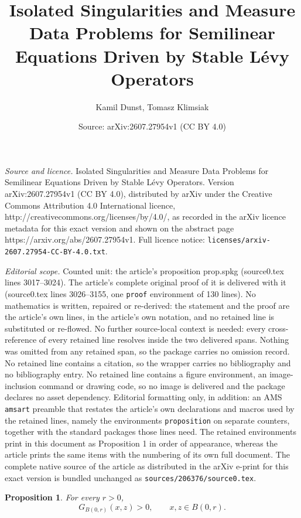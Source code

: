 \documentclass[10pt,a4paper]{amsart}
\title{Isolated Singularities and Measure Data Problems for Semilinear Equations Driven by Stable L\'evy Operators}
\author{Kamil Dunst, Tomasz Klimsiak}
\date{Source: arXiv:2607.27954v1 (CC BY 4.0)}
\newtheorem{proposition}{Proposition}
\begin{document}
\maketitle

\noindent\emph{Source and licence.} Isolated Singularities and Measure Data Problems for Semilinear Equations Driven by Stable L\'evy Operators. Version arXiv:2607.27954v1 (CC BY 4.0), distributed by arXiv under the Creative Commons Attribution 4.0 International licence, http://creativecommons.org/licenses/by/4.0/, as recorded in the arXiv licence metadata for this exact version and shown on the abstract page https://arxiv.org/abs/2607.27954v1. Full licence notice: \texttt{licenses/arxiv-2607.27954-CC-BY-4.0.txt}.\par\smallskip

\noindent\textit{Editorial scope.} Counted unit: the article's proposition prop.spkg (source0.tex lines 3017--3024). The article's complete original proof of it is delivered with it (source0.tex lines 3026--3155, one \texttt{proof} environment of 130 lines). No mathematics is written, repaired or re-derived: the statement and the proof are the article's own lines, in the article's own notation, and no retained line is substituted or re-flowed.  No further source-local context is needed: every cross-reference of every retained line resolves inside the two delivered spans.  Nothing was omitted from any retained span, so the package carries no omission record.  No retained line contains a citation, so the wrapper carries no bibliography and no bibliography entry.  No retained line contains a figure environment, an image-inclusion command or drawing code, so no image is delivered and the package declares no asset dependency.  Editorial formatting only, in addition: an AMS \texttt{amsart} preamble that restates the article's own declarations and macros used by the retained lines, namely the environments \texttt{proposition} on separate counters, together with the standard packages those lines need.  The retained environments print in this document as Proposition 1 in order of appearance, whereas the article prints the same items with the numbering of its own full document.  The complete native source of the article as distributed in the arXiv e-print for this exact version is bundled unchanged as \texttt{sources/206376/source0.tex}.
\begin{proposition}
\label{prop.spkg}
For every $r>0$,
\[
G_{B(0,r)}(x,z)>0,
\qquad x,z\in B(0,r).
\]
\end{proposition}
\end{document}
